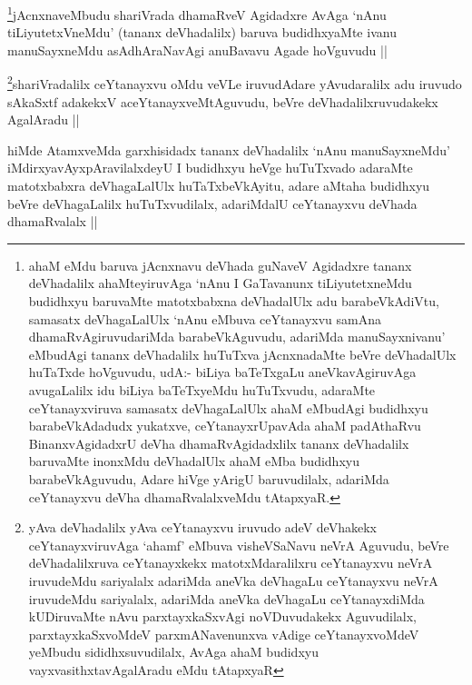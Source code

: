 \begin{artha}
\footnote{ahaM eMdu baruva jAcnxnavu deVhada guNaveV Agidadxre tananx deVhadalilx ahaMteyiruvAga `nAnu I GaTavanunx tiLiyutetxneMdu budidhxyu baruvaMte matotxbabxna deVhadalUlx adu barabeVkAdiVtu, samasatx deVhagaLalUlx `nAnu eMbuva ceYtanayxvu samAna dhamaRvAgiruvudariMda barabeVkAguvudu, adariMda manuSayxnivanu' eMbudAgi tananx deVhadalilx huTuTxva jAcnxnadaMte beVre deVhadalUlx huTaTxde hoVguvudu, udA:- biLiya baTeTxgaLu aneVkavAgiruvAga avugaLalilx idu biLiya baTeTxyeMdu huTuTxvudu, adaraMte ceYtanayxviruva samasatx deVhagaLalUlx ahaM eMbudAgi budidhxyu barabeVkAdadudx yukatxve, ceYtanayxrUpavAda ahaM padAthaRvu BinanxvAgidadxrU deVha dhamaRvAgidadxlilx tananx deVhadalilx baruvaMte inonxMdu deVhadalUlx ahaM eMba budidhxyu barabeVkAguvudu, Adare hiVge yArigU baruvudilalx, adariMda ceYtanayxvu deVha dhamaRvalalxveMdu tAtapxyaR.}jAcnxnaveMbudu shariVrada dhamaRveV Agidadxre AvAga `nAnu tiLiyutetxVneMdu' (tananx deVhadalilx) baruva budidhxyaMte ivanu manuSayxneMdu asAdhAraNavAgi anuBavavu Agade hoVguvudu || 
\end{artha}

\begin{artha}
\footnote{yAva deVhadalilx yAva ceYtanayxvu iruvudo adeV deVhakekx ceYtanayxviruvAga `ahamf' eMbuva visheVSaNavu neVrA Aguvudu, beVre deVhadalilxruva ceYtanayxkekx matotxMdaralilxru ceYtanayxvu neVrA iruvudeMdu sariyalalx adariMda aneVka deVhagaLu ceYtanayxvu neVrA iruvudeMdu sariyalalx, adariMda aneVka deVhagaLu ceYtanayxdiMda kUDiruvaMte nAvu parxtayxkaSxvAgi noVDuvudakekx Aguvudilalx, parxtayxkaSxvoMdeV parxmANavenunxva vAdige ceYtanayxvoMdeV yeMbudu sididhxsuvudilalx, AvAga ahaM budidxyu vayxvasithxtavAgalAradu eMdu tAtapxyaR}shariVradalilx ceYtanayxvu oMdu veVLe iruvudAdare yAvudaralilx adu iruvudo sAkaSxtf adakekxV aceYtanayxveMtAguvudu, beVre deVhadalilxruvudakekx AgalAradu ||
\end{artha}

\begin{artha}
hiMde AtamxveMda garxhisidadx tananx deVhadalilx `nAnu manuSayxneMdu' iMdirxyavAyxpAravilalxdeyU I budidhxyu heVge huTuTxvado adaraMte matotxbabxra deVhagaLalUlx huTaTxbeVkAyitu, adare aMtaha budidhxyu beVre deVhagaLalilx huTuTxvudilalx, adariMdalU ceYtanayxvu deVhada dhamaRvalalx ||
\end{artha}

